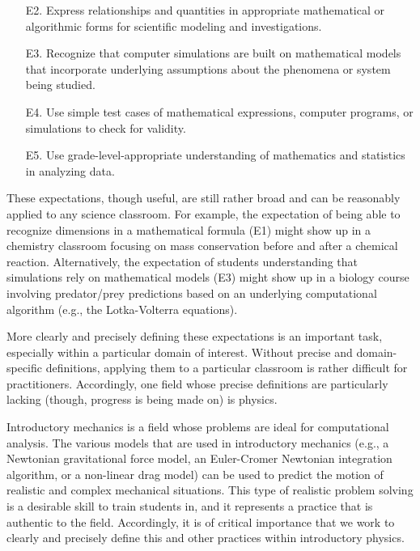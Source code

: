 \documentclass{msuphddissertation}
\begin{document}
\begin{doublespace}
\begin{enumerate}
\item[E2.] Express relationships and quantities in appropriate mathematical or algorithmic forms for scientific modeling and investigations.

\item[E3.] Recognize that computer simulations are built on mathematical models that incorporate underlying assumptions about the phenomena or system being studied.

\item[E4.] Use simple test cases of mathematical expressions, computer programs, or simulations to check for validity.

\item[E5.] Use grade-level-appropriate understanding of mathematics and statistics in analyzing data.
\end{enumerate}

These expectations, though useful, are still rather broad and can be reasonably applied to any science classroom.  For example, the expectation of being able to recognize dimensions in a mathematical formula (E1) might show up in a chemistry classroom focusing on mass conservation before and after a chemical reaction.  Alternatively, the expectation of students understanding that simulations rely on mathematical models (E3) might show up in a biology course involving predator/prey predictions based on an underlying computational algorithm (e.g., the Lotka-Volterra equations). 

More clearly and precisely defining these expectations is an important task, especially within a particular domain of interest.  Without precise and domain-specific definitions, applying them to a particular classroom is rather difficult for practitioners.  Accordingly, one field whose precise definitions are particularly lacking (though, progress is being made on) is physics.

Introductory mechanics is a field whose problems are ideal for computational analysis.  The various models that are used in introductory mechanics (e.g., a Newtonian gravitational force model, an Euler-Cromer Newtonian integration algorithm, or a non-linear drag model) can be used to predict the motion of realistic and complex mechanical situations.  This type of realistic problem solving is a desirable skill to train students in, and it represents a practice that is authentic to the field.  Accordingly, it is of critical importance that we work to clearly and precisely define this and other practices within introductory physics.


\end{doublespace}
\end{document}
